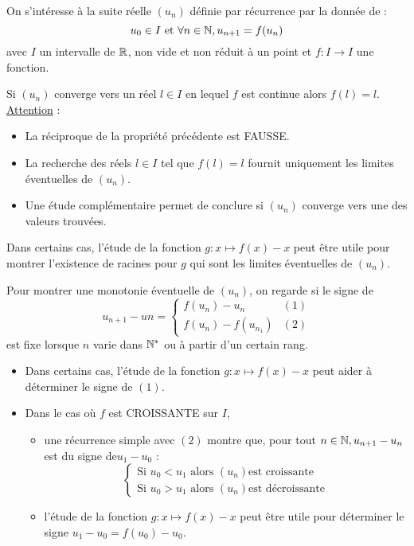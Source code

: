 \begin{defi}
    On s’intéresse à la suite réelle \((u_n)\) définie par récurrence par la donnée de :\\
    \[u_0 \in I \text{ et } \forall n \in \mathbb{N}, u_{n+1} = f (u_n)\]
    avec \(I\) un intervalle de \(\mathbb{R}\), non vide et non réduit à un point et \(f : I \to I \) une fonction.
\end{defi}
\begin{defprop}
    
    Si \((u_n)\) converge vers un réel \(l \in I\) en lequel \(f\) est continue alors \(f (l) = l\).\\
    \underline{Attention} : \\
    \begin{itemize}
        \item La réciproque de la propriété précédente est FAUSSE.
        \item La recherche des réels \(l \in I\) tel que \(f (l) = l\) fournit uniquement les limites éventuelles de \((u_n)\).
        \item Une étude complémentaire permet de conclure si \((u_n)\) converge vers une des valeurs trouvées.
    \end{itemize}
    Dans certains cas, l’étude de la fonction \(g : x \mapsto f (x) - x\) peut être utile pour montrer l’existence de racines pour \(g\) qui sont les limites éventuelles de \((u_n)\).
\end{defprop}

\begin{defprop}
    Pour montrer une monotonie éventuelle de \((u_n)\), on regarde si le signe de
    \[u_{n+1} - un = \begin{cases}
        f(u_n)-u_n &(1)\\
        f(u_n)-f(u_{n_1}) &(2)
    \end{cases}\]
    est fixe lorsque \(n\) varie dans \(\mathbb{N}^*\) ou à partir d’un certain rang.
    \begin{itemize}
        \item Dans certains cas, l’étude de la fonction \(g : x \mapsto f (x) - x\) peut aider à déterminer le signe de \((1)\).
        \item Dans le cas où \(f\) est CROISSANTE sur \(I\),
        \begin{itemize}
            \item une récurrence simple avec \((2)\) montre que, pour tout \(n \in \mathbb{N}, u_{n+1} - u_n\) est du signe de\( u_1 - u_0\) :
            \[\begin{cases} 
                \text{Si }u_0 < u_1 \text{ alors } (u_n) \text{est croissante}\\
                \text{Si }u_0 > u_1 \text{ alors } (u_n) \text{est décroissante}
            \end{cases}\]
            \item l’étude de la fonction \(g : x \mapsto f (x)-x\) peut être utile pour déterminer le signe \(u_1 -u_0 = f (u_0)-u_0\).
        \end{itemize} 
    \end{itemize}
\end{defprop}